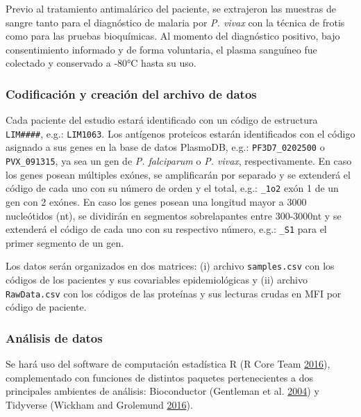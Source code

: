 \documentclass[
  a4paper]{article}
\begin{document}
Previo al tratamiento antimalárico del paciente, se extrajeron las
muestras de sangre tanto para el diagnóstico de malaria por \emph{P.
vivax} con la técnica de frotis como para las pruebas bioquímicas. Al
momento del diagnóstico positivo, bajo consentimiento informado y de
forma voluntaria, el plasma sanguíneo fue colectado y conservado a -80°C
hasta su uso.

\hypertarget{codificaciuxf3n-y-creaciuxf3n-del-archivo-de-datos}{%
\subsubsection{Codificación y creación del archivo de
datos}\label{codificaciuxf3n-y-creaciuxf3n-del-archivo-de-datos}}

Cada paciente del estudio estará identificado con un código de
estructura \texttt{LIM\#\#\#\#}, e.g.: \texttt{LIM1063}. Los antígenos
proteicos estarán identificados con el código asignado a sus genes en la
base de datos PlasmoDB, e.g.: \texttt{PF3D7\_0202500} o
\texttt{PVX\_091315}, ya sea un gen de \emph{P. falciparum} o \emph{P.
vivax}, respectivamente. En caso los genes posean múltiples exónes, se
amplificarán por separado y se extenderá el código de cada uno con su
número de orden y el total, e.g.: \texttt{\_1o2} exón 1 de un gen con 2
exónes. En caso los genes posean una longitud mayor a 3000 nucleótidos
(nt), se dividirán en segmentos sobrelapantes entre 300-3000nt y se
extenderá el código de cada uno con su respectivo número, e.g.:
\texttt{\_S1} para el primer segmento de un gen.

Los datos serán organizados en dos matrices: (i) archivo
\texttt{samples.csv} con los códigos de los pacientes y sus covariables
epidemiológicas y (ii) archivo \texttt{RawData.csv} con los códigos de
las proteínas y sus lecturas crudas en MFI por código de paciente.

\hypertarget{anadata}{%
\subsubsection{Análisis de datos}\label{anadata}}

Se hará uso del software de computación estadística R (R Core Team
\protect\hyperlink{ref-R2016}{2016}), complementado con funciones de
distintos paquetes pertenecientes a dos principales ambientes de
análisis: Bioconductor (Gentleman et al.
\protect\hyperlink{ref-bioconductor2004}{2004}) y Tidyverse (Wickham and
Grolemund \protect\hyperlink{ref-wickham2016r4ds}{2016}).
\end{document}

